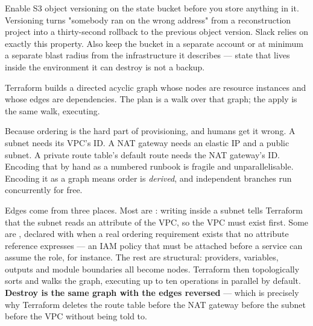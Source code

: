 \begin{drtip}
Enable S3 object versioning on the state bucket before you store anything in it. Versioning turns "somebody ran  on the wrong address" from a reconstruction project into a thirty-second rollback to the previous object version. Slack relies on exactly this property. Also keep the bucket in a separate account or at minimum a separate blast radius from the infrastructure it describes --- state that lives inside the environment it can destroy is not a backup.
\end{drtip}


 Terraform builds a directed acyclic graph whose nodes are resource instances and whose edges are dependencies. The plan is a walk over that graph; the apply is the same walk, executing.

 Because ordering is the hard part of provisioning, and humans get it wrong. A subnet needs its VPC's ID. A NAT gateway needs an elastic IP and a public subnet. A private route table's default route needs the NAT gateway's ID. Encoding that by hand as a numbered runbook is fragile and unparallelisable. Encoding it as a graph means order is \emph{derived}, and independent branches run concurrently for free.

 Edges come from three places. Most are : writing  inside a subnet tells Terraform that the subnet reads an attribute of the VPC, so the VPC must exist first. Some are , declared with  when a real ordering requirement exists that no attribute reference expresses --- an IAM policy that must be attached before a service can assume the role, for instance. The rest are structural: providers, variables, outputs and module boundaries all become nodes. Terraform then topologically sorts and walks the graph, executing up to ten operations in parallel by default. \textbf{Destroy is the same graph with the edges reversed} --- which is precisely why Terraform deletes the route table before the NAT gateway before the subnet before the VPC without being told to.

